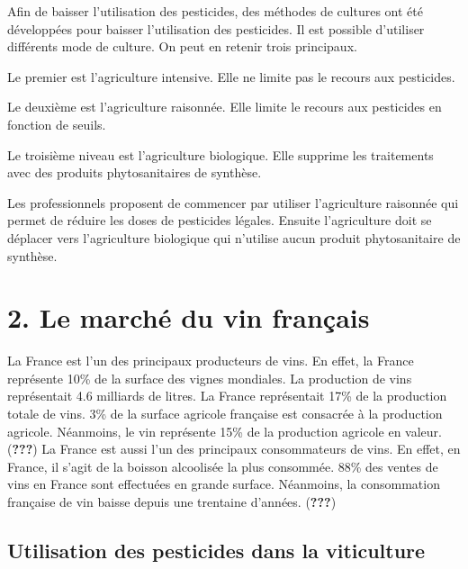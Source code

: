 \documentclass[11pt,]{article}
\begin{document}
Afin de baisser l'utilisation des pesticides, des méthodes de cultures
ont été développées pour baisser l'utilisation des pesticides. Il est
possible d'utiliser différents mode de culture. On peut en retenir trois
principaux.

Le premier est l'agriculture intensive. Elle ne limite pas le recours
aux pesticides.

Le deuxième est l'agriculture raisonnée. Elle limite le recours aux
pesticides en fonction de seuils.

Le troisième niveau est l'agriculture biologique. Elle supprime les
traitements avec des produits phytosanitaires de synthèse.

Les professionnels proposent de commencer par utiliser l'agriculture
raisonnée qui permet de réduire les doses de pesticides légales. Ensuite
l'agriculture doit se déplacer vers l'agriculture biologique qui
n'utilise aucun produit phytosanitaire de synthèse.

\hypertarget{le-marche-du-vin-francais}{%
\section{2. Le marché du vin français}\label{le-marche-du-vin-francais}}

La France est l'un des principaux producteurs de vins. En effet, la
France représente 10\% de la surface des vignes mondiales. La production
de vins représentait 4.6 milliards de litres. La France représentait
17\% de la production totale de vins. 3\% de la surface agricole
française est consacrée à la production agricole. Néanmoins, le vin
représente 15\% de la production agricole en valeur. ({\textbf{???}}) La
France est aussi l'un des principaux consommateurs de vins. En effet, en
France, il s'agit de la boisson alcoolisée la plus consommée. 88\% des
ventes de vins en France sont effectuées en grande surface. Néanmoins,
la consommation française de vin baisse depuis une trentaine d'années.
({\textbf{???}})

\hypertarget{utilisation-des-pesticides-dans-la-viticulture}{%
\subsection{Utilisation des pesticides dans la
viticulture}\label{utilisation-des-pesticides-dans-la-viticulture}}
\end{document}
